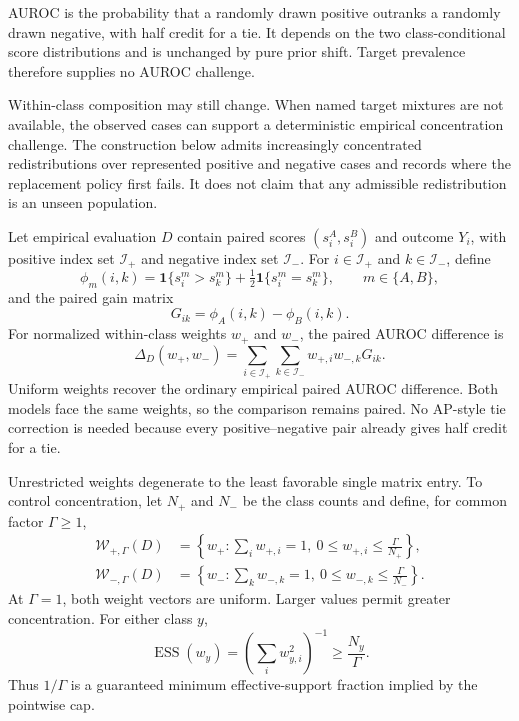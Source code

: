 \documentclass[11pt]{article}
\theoremstyle{remark}
\begin{document}
AUROC is the probability that a randomly drawn positive outranks a randomly
drawn negative, with half credit for a tie. It depends on the two
class-conditional score distributions and is unchanged by pure prior shift.
Target prevalence therefore supplies no AUROC challenge.

Within-class composition may still change. When named target mixtures are not
available, the observed cases can support a deterministic empirical
concentration challenge. The construction below admits increasingly
concentrated redistributions over represented positive and negative cases and
records where the replacement policy first fails. It does not claim that any
admissible redistribution is an unseen population.

Let empirical evaluation $D$ contain paired scores $(s_i^A,s_i^B)$ and outcome
$Y_i$, with positive index set $\mathcal I_+$ and negative index set
$\mathcal I_-$. For $i\in\mathcal I_+$ and $k\in\mathcal I_-$, define
\[
\phi_m(i,k)
=
\mathbf 1\{s_i^m>s_k^m\}
+\tfrac12\mathbf 1\{s_i^m=s_k^m\},
\qquad m\in\{A,B\},
\]
and the paired gain matrix
\[
G_{ik}=\phi_A(i,k)-\phi_B(i,k).
\]
For normalized within-class weights $w_+$ and $w_-$, the paired AUROC
difference is
\begin{equation}
\Delta_D(w_+,w_-)
=
\sum_{i\in\mathcal I_+}
\sum_{k\in\mathcal I_-}
w_{+,i}w_{-,k}G_{ik}.
\label{eq:auroc-weighted}
\end{equation}
Uniform weights recover the ordinary empirical paired AUROC difference. Both
models face the same weights, so the comparison remains paired. No AP-style
tie correction is needed because every positive--negative pair already gives
half credit for a tie.

Unrestricted weights degenerate to the least favorable single matrix entry.
To control concentration, let $N_+$ and $N_-$ be the class counts and define,
for common factor $\Gamma\geq1$,
\begin{align}
\mathcal W_{+,\Gamma}(D)
&=
\left\{w_+:
\sum_iw_{+,i}=1,
\ 0\leq w_{+,i}\leq\frac{\Gamma}{N_+}
\right\},
\label{eq:positive-cap}\\
\mathcal W_{-,\Gamma}(D)
&=
\left\{w_-:
\sum_kw_{-,k}=1,
\ 0\leq w_{-,k}\leq\frac{\Gamma}{N_-}
\right\}.
\label{eq:negative-cap}
\end{align}
At $\Gamma=1$, both weight vectors are uniform. Larger values permit greater
concentration. For either class $y$,
\[
\operatorname{ESS}(w_y)
=
\left(\sum_iw_{y,i}^2\right)^{-1}
\geq
\frac{N_y}{\Gamma}.
\]
Thus $1/\Gamma$ is a guaranteed minimum effective-support fraction implied by
the pointwise cap.
\end{document}
